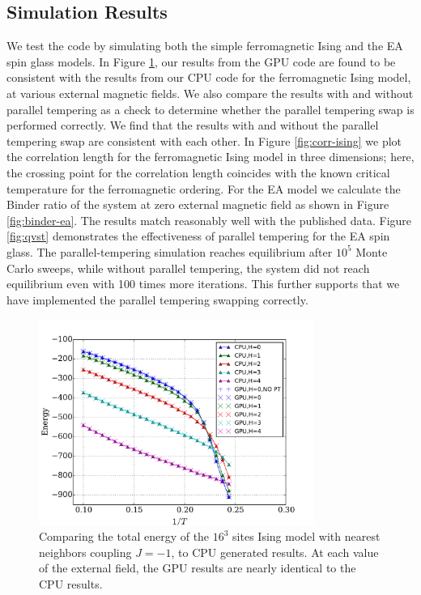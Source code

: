 \subsection{Simulation Results}
\label{section_result}

We test the code by simulating  both the simple ferromagnetic
Ising and the EA spin glass models.  In Figure
\ref{fig:energy-ising}, our results from the GPU code are found to be
consistent with the results from our CPU code for the ferromagnetic
Ising model, at various external magnetic fields. We also compare the
results with and without parallel tempering as a check to determine
whether the parallel tempering swap is performed correctly. We find
that the results with and without the parallel tempering swap are
consistent with each other. In Figure \ref{fig:corr-ising} we plot
the correlation length for the ferromagnetic Ising model in three
dimensions; here, the crossing point for the correlation length coincides
with the known critical temperature for the ferromagnetic
ordering. \cite{PhysRevB.44.5081}
For the EA model we calculate the Binder ratio
of the system at zero external magnetic field as shown in Figure
\ref{fig:binder-ea}. The results match reasonably well with the
published data. \cite{Katzgraber-Korner-Young-2006} Figure \ref{fig:qvst} demonstrates the effectiveness
of parallel tempering for the EA spin glass. The
parallel-tempering simulation reaches equilibrium after $10^5$ Monte
Carlo sweeps, while without parallel tempering, the system did not
reach equilibrium even with 100 times more iterations. This further
supports that we have implemented the parallel tempering swapping
correctly.

\begin{figure}[ht!]
    \centering
    \includegraphics[width=0.8\textwidth]{img/energy_compare.pdf}
    \caption{Comparing the total energy of the $16^3$ sites Ising model with nearest neighbors coupling $J=-1$, to CPU generated results. At each value of 
      the external field, the GPU results are nearly identical to the CPU results. }
    \label{fig:energy-ising}
    \end{figure}

